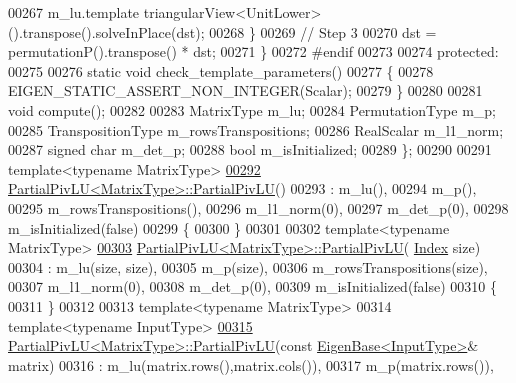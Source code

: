 \begin{DoxyCode}
00267         m\_lu.template triangularView<UnitLower>().transpose().solveInPlace(dst);
00268       \}
00269       \textcolor{comment}{// Step 3}
00270       dst = permutationP().transpose() * dst;
00271     \}
00272 \textcolor{preprocessor}{    #endif}
00273 
00274   \textcolor{keyword}{protected}:
00275 
00276     \textcolor{keyword}{static} \textcolor{keywordtype}{void} check\_template\_parameters()
00277     \{
00278       EIGEN\_STATIC\_ASSERT\_NON\_INTEGER(Scalar);
00279     \}
00280 
00281     \textcolor{keywordtype}{void} compute();
00282 
00283     MatrixType m\_lu;
00284     PermutationType m\_p;
00285     TranspositionType m\_rowsTranspositions;
00286     RealScalar m\_l1\_norm;
00287     \textcolor{keywordtype}{signed} \textcolor{keywordtype}{char} m\_det\_p;
00288     \textcolor{keywordtype}{bool} m\_isInitialized;
00289 \};
00290 
00291 \textcolor{keyword}{template}<\textcolor{keyword}{typename} MatrixType>
\hyperlink{group___l_u___module_a5c04818d354f94a98786d8a44cb709c6}{00292} \hyperlink{group___l_u___module_a5c04818d354f94a98786d8a44cb709c6}{PartialPivLU<MatrixType>::PartialPivLU}()
00293   : m\_lu(),
00294     m\_p(),
00295     m\_rowsTranspositions(),
00296     m\_l1\_norm(0),
00297     m\_det\_p(0),
00298     m\_isInitialized(false)
00299 \{
00300 \}
00301 
00302 \textcolor{keyword}{template}<\textcolor{keyword}{typename} MatrixType>
\hyperlink{group___l_u___module_acf892c12d8a229b32bddc3149e32e63a}{00303} \hyperlink{group___l_u___module_class_eigen_1_1_partial_piv_l_u}{PartialPivLU<MatrixType>::PartialPivLU}(
      \hyperlink{group___core___module_a554f30542cc2316add4b1ea0a492ff02}{Index} size)
00304   : m\_lu(size, size),
00305     m\_p(size),
00306     m\_rowsTranspositions(size),
00307     m\_l1\_norm(0),
00308     m\_det\_p(0),
00309     m\_isInitialized(false)
00310 \{
00311 \}
00312 
00313 \textcolor{keyword}{template}<\textcolor{keyword}{typename} MatrixType>
00314 \textcolor{keyword}{template}<\textcolor{keyword}{typename} InputType>
\hyperlink{group___l_u___module_acf37214aebb54d0e186ae39ac6c41bdf}{00315} \hyperlink{group___l_u___module_class_eigen_1_1_partial_piv_l_u}{PartialPivLU<MatrixType>::PartialPivLU}(\textcolor{keyword}{const} 
      \hyperlink{group___core___module_struct_eigen_1_1_eigen_base}{EigenBase<InputType>}& matrix)
00316   : m\_lu(matrix.rows(),matrix.cols()),
00317     m\_p(matrix.rows()),

\end{DoxyCode}

